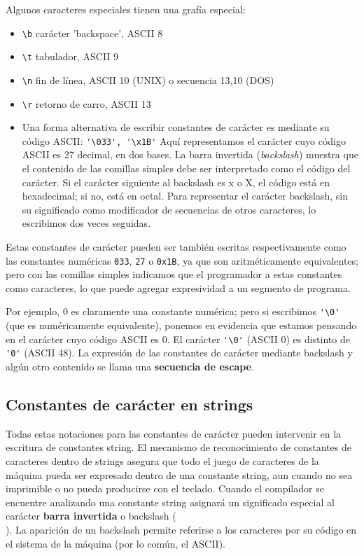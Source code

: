 Algunos caracteres especiales tienen una grafía especial:
\begin{itemize}
	\item \lstinline{\b} carácter 'backspace', ASCII 8
\item \lstinline{\t} tabulador, ASCII 9
\item \lstinline{\n} fin de línea, ASCII 10 (UNIX) o secuencia 13,10 (DOS)
\item \lstinline{\r} retorno de carro, ASCII 13
\item Una forma alternativa de escribir constantes de carácter es mediante su código ASCII:
\lstinline{'\033', '\x1B'}
Aquí representamos el carácter cuyo código ASCII es 27 decimal, en dos bases. La barra invertida
(\textit{backslash}) muestra que el contenido de las comillas simples debe ser interpretado como el código del
carácter. Si el carácter siguiente al backslash es x o X, el código está en hexadecimal; si no, está en
octal. Para representar el carácter backslash, sin su significado como modificador de secuencias de
otros caracteres, lo escribimos dos veces seguidas.
\end{itemize}


Estas constantes de carácter pueden ser también escritas respectivamente como las constantes
numéricas \texttt{033}, \texttt{27} o \texttt{0x1B}, ya que son aritméticamente equivalentes; pero con las comillas simples
indicamos que el programador  a estas constantes como caracteres, lo que puede agregar
expresividad a un segmento de programa.

Por ejemplo, 0 es claramente una constante numérica; pero si escribimos \lstinline{'\0'} (que es numéricamente
equivalente), ponemos en evidencia que estamos pensando en el carácter cuyo código ASCII es 0. El carácter
\lstinline{'\0'} (ASCII 0) es distinto de \lstinline{'0'} (ASCII 48). La expresión de las constantes de carácter mediante
backslash y algún otro contenido se llama una \textbf{secuencia de escape}.




\subsection{Constantes de carácter en strings}
Todas estas notaciones para las constantes de carácter pueden intervenir en la escritura de constantes
string. El mecanismo de reconocimiento de constantes de caracteres dentro de strings asegura que todo el
juego de caracteres de la máquina pueda ser expresado dentro de una constante string, aun cuando no
sea imprimible o no pueda producirse con el teclado. Cuando el compilador se encuentre analizando
una constante string asignará un significado especial al carácter \textbf{barra invertida} o backslash (\texttt{\\}). La
aparición de un backslash permite referirse a los caracteres por su código en el sistema de la máquina
(por lo común, el ASCII).

